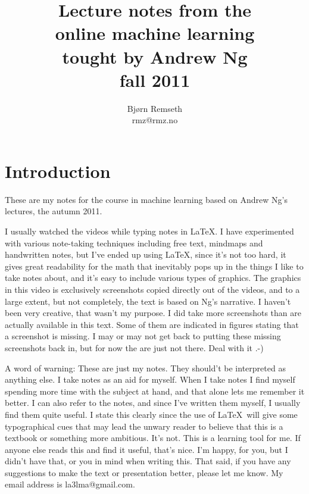 \documentclass[a4, 12pt, english, USenglish]{scrreprt}
\begin{document}
\title{Lecture notes from the \\
online  machine learning\\
tought by Andrew Ng \\
fall 2011}

\author{Bj\o{}rn Remseth \\ rmz@rmz.no}

\maketitle
\tableofcontents



\begin{abstract}

\end{abstract}

\chapter*{Introduction}

These are my notes for the course in machine learning  based on Andrew
Ng's lectures, the autumn 2011.    

I usually watched the videos while typing notes in \LaTeX.  I have
experimented with various note-taking techniques including free text,
mindmaps and handwritten notes, but I've ended up using \LaTeX, since
it's not too hard, it gives great readability for the math that
inevitably pops up in the things I like to take notes about, and it's
easy to include various types of graphics.  The graphics in this video
is exclusively screenshots copied directly out of the videos, and to a
large extent, but not  completely, the text is based on Ng's
narrative.   I haven't been very creative, that wasn't my purpose.  I
did take more screenshots than are actually available in this text.
Some of them are indicated in figures stating that a screenshot is
missing.  I may or may not get back to putting these missing
screenshots back in, but for  now the are just not there.  Deal with
it .-)


A word of warning: These are just my notes.  They should't be
interpreted as anything else.  I take notes as an aid for myself.
When I take notes I find myself spending more time with the subject at
hand, and that alone lets me remember it better.  I can also refer to
the notes, and since I've written them myself, I usually find them
quite useful.   I state this clearly since the use of \LaTeX\ will
give some typographical cues that may lead the unwary reader to
believe that this is a textbook or something more ambitious.  It's
not.  This is a learning tool for me.  If anyone else reads this and
find it useful, that's nice. I'm happy,  for you, but I didn't have
that, or you in mind when writing this.   That said, if you have any
suggestions to make the text or presentation better, please let me
know.  My email address is la3lma@gmail.com.
\end{document}
